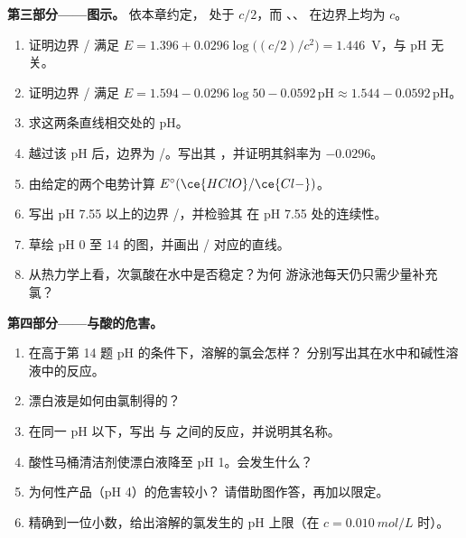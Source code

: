 \begin{problem}
\medskip
\noindent\textbf{第三部分——图示。}
依本章约定， 处于 $c/2$，而
、、 在边界上均为 $c$。
\begin{enumerate}[resume]
  \item 证明边界 / 满足 $E = 1.396 +
        0.0296\log\bigl((c/2)/c^2\bigr) = 1.446$~V，与 pH 无关。
  \item 证明边界 / 满足 $E = 1.594 -
        0.0296\log 50 - 0.0592\,\mathrm{pH} \approx 1.544 -
        0.0592\,\mathrm{pH}$。
  \item 求这两条直线相交处的 pH。
  \item 越过该 pH 后，边界为 /。写出其
        ，并证明其斜率为 $-0.0296$。
  \item 由给定的两个电势计算 $E^\circ(\ce{HClO}/\ce{Cl-})$。
  \item 写出 pH 7.55 以上的边界 /，并检验其
        在 pH 7.55 处的连续性。
  \item 草绘 pH 0 至 14 的图，并画出 / 对应的直线。
  \item 从热力学上看，次氯酸在水中是否稳定？为何
        游泳池每天仍只需少量补充氯？
\end{enumerate}

\medskip
\noindent\textbf{第四部分——与酸的危害。}
\begin{enumerate}[resume]
  \item 在高于第 14 题 pH 的条件下，溶解的氯会怎样？
        分别写出其在水中和碱性溶液中的反应。
  \item 漂白液是如何由氯制得的？
  \item 在同一 pH 以下，写出  与
         之间的反应，并说明其名称。
  \item 酸性马桶清洁剂使漂白液降至 pH 1。会发生什么？
  \item 为何性产品（pH 4）的危害较小？
        请借助图作答，再加以限定。
  \item 精确到一位小数，给出溶解的氯发生的
        pH 上限（在 $c = \qty{0.010}{mol/L}$ 时）。
\end{enumerate}
\end{problem}
